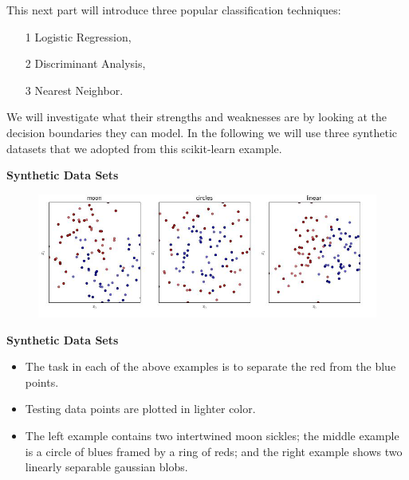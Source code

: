 \documentclass[MASTER.tex]{subfiles}
\begin{document}
\begin{frame}[fragile]
\Large
This next part will introduce three popular classification techniques: 
\begin{itemize}
\item[1] Logistic Regression, 
\item[2] Discriminant Analysis, 
\item[3] Nearest Neighbor.
\end{itemize} We will investigate what their strengths and weaknesses are by looking at the decision boundaries they can model. In the following we will use three synthetic datasets that we adopted from this scikit-learn example.
\end{frame}
\begin{frame}
	\textbf{Synthetic Data Sets}
\begin{figure}
\centering
\includegraphics[width=0.99\linewidth]{sklcass/sklclass12}

\end{figure}
\end{frame}
\begin{frame}
\textbf{Synthetic Data Sets}
\begin{itemize}
\item The task in each of the above examples is to separate the red from the blue points. 
\item Testing data points are plotted in lighter color. 
\item The left example contains two intertwined moon sickles; the middle example is a circle of blues framed by a ring of reds; and the right example shows two linearly separable gaussian blobs.
\end{itemize}

\end{frame}
\end{document}
